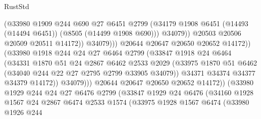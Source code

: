 \begin{lexlean}{RustStd}
\begin{coremodule}
                                    (@33980
                                      @1909
                                      @244
                                      @690
                                      @27
                                      @6451
                                      @2799
                                      (@34179
                                        @1908
                                        @6451
                                        (@14493 (@14494 @6451))
                                        (@8505 (@14499 @1908 @690)))
                                      @34079))
                                  @20503
                                  @20506
                                  @20509
                                  @20511
                                  @14172))
                              @34079)))
                        @20644
                        @20647
                        @20650
                        @20652
                        @14172))
                    (@33980
                      @1918
                      @244
                      @24
                      @27
                      @6464
                      @2799
                      (@33847
                        @1918
                        @24
                        @6464
                        (@34331
                          @1870
                          @51
                          @24
                          @2867
                          @6462
                          @2533
                          @2029
                          (@33975 @1870 @51 @6462 (@34040 @244 @22 @27 @2795 @2799 @33905 @34079))
                          @34371
                          @34374
                          @34377
                          @34379
                          @14172))
                      @34079)))
                @20644
                @20647
                @20650
                @20652
                @14172))
            (@33980
              @1929
              @244
              @24
              @27
              @6476
              @2799
              (@33847
                @1929
                @24
                @6476
                (@34160
                  @1928
                  @1567
                  @24
                  @2867
                  @6474
                  @2533
                  @1574
                  (@33975
                    @1928
                    @1567
                    @6474
                    (@33980
                      @1926
                      @244

\end{coremodule}
\end{lexlean}
